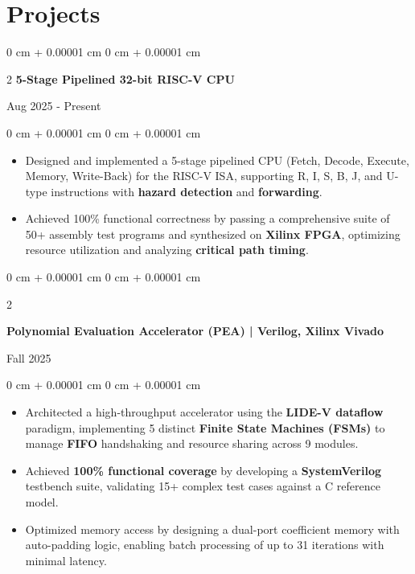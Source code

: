\documentclass[10pt, letterpaper]{article}
\newenvironment{highlights}{
    \begin{itemize}[
        topsep=0.05 cm,
        parsep=0.05 cm,
        partopsep=0pt,
        itemsep=0pt,
        leftmargin=0 cm + 10pt
    ]
}{
    \end{itemize}
}
\newenvironment{onecolentry}{
    \begin{adjustwidth}{
        0 cm + 0.00001 cm
    }{
        0 cm + 0.00001 cm
    }
}{
    \end{adjustwidth}
}
\newenvironment{twocolentry}[2][]{
    \onecolentry
    \def\secondColumn{#2}
    \setcolumnwidth{\fill, 4.5 cm}
    \begin{paracol}{2}
}{
    \switchcolumn \raggedleft \secondColumn
    \end{paracol}
    \endonecolentry
}
\begin{document}
    \section{Projects}
    
        \begin{twocolentry}{
            Aug 2025 - Present } \textbf{ 5-Stage Pipelined 32-bit RISC-V CPU}
        \end{twocolentry}
        \vspace{0.05 cm}
        \begin{onecolentry}
            \begin{highlights}
                \item Designed and implemented a 5-stage pipelined CPU (Fetch, Decode, Execute, Memory, Write-Back) for the RISC-V ISA, supporting R, I, S, B, J, and U-type instructions with \textbf{hazard detection} and \textbf{forwarding}.
                \item Achieved 100\% functional correctness by passing a comprehensive suite of 50+ assembly test programs and synthesized on \textbf{Xilinx FPGA}, optimizing resource utilization and analyzing \textbf{critical path timing}.
            \end{highlights}
        \end{onecolentry}

        \vspace{0.10 cm}
        \begin{twocolentry}{
            Fall 2025
        }
            \textbf{Polynomial Evaluation Accelerator (PEA) | Verilog, Xilinx Vivado}
        \end{twocolentry}
        \vspace{0.05 cm}
        \begin{onecolentry}
            \begin{highlights}
                \item Architected a high-throughput accelerator using the \textbf{LIDE-V dataflow} paradigm, implementing 5 distinct \textbf{Finite State Machines (FSMs)} to manage \textbf{FIFO} handshaking and resource sharing across 9 modules.
                \item Achieved \textbf{100\% functional coverage} by developing a \textbf{SystemVerilog} testbench suite, validating 15+ complex test cases against a C reference model.
                \item Optimized memory access by designing a dual-port coefficient memory with auto-padding logic, enabling batch processing of up to 31 iterations with minimal latency.
            \end{highlights}
        \end{onecolentry}
        \vspace{0.10 cm}
\end{document}
